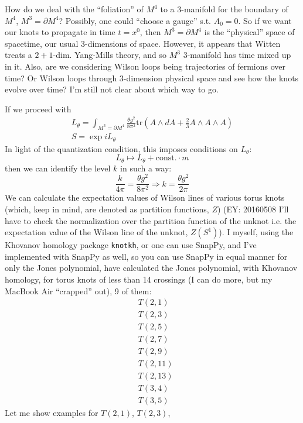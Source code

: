 \documentclass[10pt]{amsart}
\begin{document}
How do we deal with the ``foliation'' of $M^4$ to a 3-manifold for the boundary of $M^4$, $M^3 = \partial M^4$?  Possibly, one could ``choose a gauge'' s.t. $A_0 =0$.  So if we want our knots to propagate in time $t=x^0$, then $M^3 = \partial M^4$ is the ``physical'' space of spacetime, our usual 3-dimensions of space.  However, it appears that Witten \cite{Witten:1988hf} treats a $2+1$-dim. Yang-Mills theory, and so $M^3$ 3-manifold has time mixed up in it.  Also, are we considering Wilson loops being trajectories of fermions over time?  Or Wilson loops through 3-dimension physical space and see how the knots evolve over time?  I'm still not clear about which way to go.

If we proceed with
\begin{equation}
\begin{gathered}
  L_{\theta} = \int_{M^3 = \partial M^4} \frac{ \theta g^2}{8 \pi^2} \text{tr}(A\wedge dA + \frac{2}{3} A\wedge A \wedge A ) \\ 
  S = \exp{ i L_{\theta}}
  \end{gathered}
\end{equation}
In light of the quantization condition, this imposes conditions on $L_{\theta}$:
\[
L_{\theta} \mapsto L_{\theta} + \text{const.} \cdot m
\]
then we can identify the level $k$ in such a way:
\[
\frac{k}{4\pi} = \frac{\theta g^2}{ 8\pi^2} \Longrightarrow k = \frac{\theta g^2}{2\pi}
\]
We can calculate the expectation values of Wilson lines of various torus knots (which, keep in mind, are denoted as partition functions, $Z$) (EY: 20160508 I'll have to check the normalization over the partition function of the unknot i.e. the expectation value of the Wilson line of the unknot, $Z(S^1)$).  I myself, using the Khovanov homology package  \verb|knotkh|, or one can use SnapPy, and I've implemented with SnapPy as well, so you can use SnapPy in equal manner for only the Jones polynomial, have calculated the Jones polynomial, with Khovanov homology, for torus knots of less than 14 crossings (I can do more, but my MacBook Air ``crapped'' out), 9 of them:
\[
\begin{aligned}
  & T(2,1) \\ 
  & T(2,3) \\ 
  & T(2,5) \\ 
  & T(2,7) \\ 
  & T(2,9) \\ 
  & T(2,11) \\ 
  & T(2,13) \\ 
  & T(3,4) \\ 
  & T(3,5) 
  \end{aligned}
\]
Let me show examples for $T(2,1)$, $T(2,3)$, %
\end{document}
